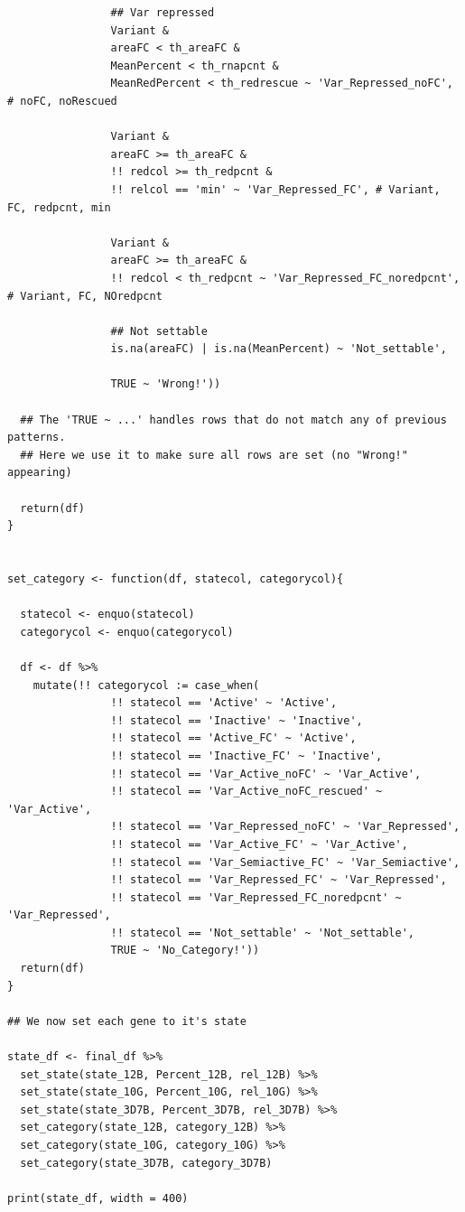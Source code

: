 \documentclass[11pt]{article}
\begin{document}
\begin{verbatim}
                ## Var repressed
                Variant &
                areaFC < th_areaFC &
                MeanPercent < th_rnapcnt &
                MeanRedPercent < th_redrescue ~ 'Var_Repressed_noFC', # noFC, noRescued

                Variant &
                areaFC >= th_areaFC &
                !! redcol >= th_redpcnt &
                !! relcol == 'min' ~ 'Var_Repressed_FC', # Variant, FC, redpcnt, min

                Variant &
                areaFC >= th_areaFC &
                !! redcol < th_redpcnt ~ 'Var_Repressed_FC_noredpcnt', # Variant, FC, NOredpcnt

                ## Not settable
                is.na(areaFC) | is.na(MeanPercent) ~ 'Not_settable',

                TRUE ~ 'Wrong!'))

  ## The 'TRUE ~ ...' handles rows that do not match any of previous patterns.
  ## Here we use it to make sure all rows are set (no "Wrong!" appearing)

  return(df)
}


set_category <- function(df, statecol, categorycol){

  statecol <- enquo(statecol)
  categorycol <- enquo(categorycol)

  df <- df %>%
    mutate(!! categorycol := case_when(
                !! statecol == 'Active' ~ 'Active',
                !! statecol == 'Inactive' ~ 'Inactive',
                !! statecol == 'Active_FC' ~ 'Active',
                !! statecol == 'Inactive_FC' ~ 'Inactive',
                !! statecol == 'Var_Active_noFC' ~ 'Var_Active',
                !! statecol == 'Var_Active_noFC_rescued' ~ 'Var_Active',
                !! statecol == 'Var_Repressed_noFC' ~ 'Var_Repressed',
                !! statecol == 'Var_Active_FC' ~ 'Var_Active',
                !! statecol == 'Var_Semiactive_FC' ~ 'Var_Semiactive',
                !! statecol == 'Var_Repressed_FC' ~ 'Var_Repressed',
                !! statecol == 'Var_Repressed_FC_noredpcnt' ~ 'Var_Repressed',
                !! statecol == 'Not_settable' ~ 'Not_settable',
                TRUE ~ 'No_Category!'))
  return(df)
}

## We now set each gene to it's state

state_df <- final_df %>%
  set_state(state_12B, Percent_12B, rel_12B) %>%
  set_state(state_10G, Percent_10G, rel_10G) %>%
  set_state(state_3D7B, Percent_3D7B, rel_3D7B) %>%
  set_category(state_12B, category_12B) %>%
  set_category(state_10G, category_10G) %>%
  set_category(state_3D7B, category_3D7B)

print(state_df, width = 400)
\end{verbatim}
\end{document}
